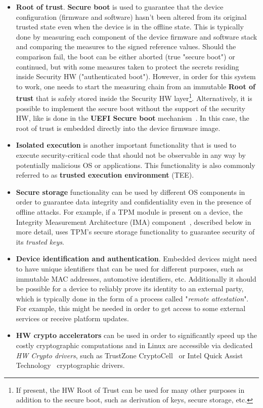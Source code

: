 \begin{itemize}
	\item \textbf{Root of trust}. \textbf{Secure boot} is used to guarantee that the device configuration (firmware and software) hasn't been altered from its original trusted state even when the device is in the offline state. This is typically done by measuring each component of the device firmware and software stack and comparing the measures to the signed reference values. Should the comparison fail, the boot can be either aborted (true "secure boot") or continued, but with some measures taken to protect the secrets residing inside Security HW ("authenticated boot"). However, in order for this system to work, one needs to start the measuring chain from an immutable \textbf{Root of trust} that is safely stored inside the Security HW layer\footnote{If present, the HW Root of Trust can be used for many other purposes in addition to the secure boot, such as derivation of keys, secure storage, etc.}. Alternatively, it is possible to implement the secure boot without the support of the security HW, like is done in the \textbf{UEFI Secure boot} mechanism~\cite{uefi}. In this case, the root of trust is embedded directly into the device firmware image.
	\item \textbf{Isolated execution} is another important functionality that is used to execute security-critical code that should not be observable in any way by potentially malicious OS or applications. This functionality is also commonly referred to as \textbf{trusted execution environment} (TEE).
	\item \textbf{Secure storage} functionality can be used by different OS components in order to guarantee data integrity and confidentiality even in the presence of offline attacks. For example, if a TPM module is present on a device, the Integrity Measurement Architecture (IMA) component~\cite{ima}, described below in more detail, uses TPM's secure storage functionality to guarantee security of its \textit{trusted keys}.
	\item \textbf{Device identification and authentication}. Embedded devices might need to have unique identifiers that can be used for different purposes, such as immutable MAC addresses, automotive identifiers, etc.  Additionally it should be possible for a device to reliably prove its identity to an external party, which is typically done in the form of a process called "\textit{remote attestation}". For example, this might be needed in order to get access to some external services or receive platform updates.
	\item \textbf{HW crypto accelerators} can be used in order to significantly speed up the costly cryptographic computations and in Linux are accessible via dedicated \textit{HW Crypto drivers}, such as TrustZone CryptoCell~\cite{cryptocell} or Intel Quick Assist Technology~\cite{intelQAT} cryptographic drivers.
\end{itemize}


